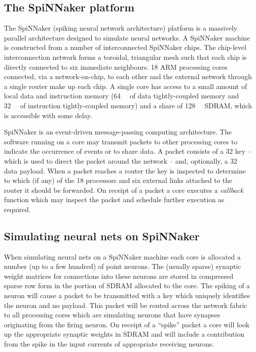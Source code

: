 \documentclass[conference]{IEEEtran}
\begin{document}
  \subsection{The SpiNNaker platform}

  The SpiNNaker (spiking neural network architecture) platform is a massively
  parallel architecture designed to simulate neural networks.  A SpiNNaker
  machine is constructed from a number of interconnected SpiNNaker chips.  The
  chip-level interconnection network forms a toroidal, triangular mesh such
  that each chip is directly connected to six immediate neighbours.  18 ARM
  processing cores connected, via a network-on-chip, to each other and the
  external network through a single router make up each chip.  A single core
  has access to a small amount of local data and instruction memory
  (\SI{64}{\kibi\byte} of data tightly-coupled memory and \SI{32}{\kibi\byte}
  of instruction tightly-coupled memory) and a share of \SI{128}{\mebi\byte}
  SDRAM, which is accessible with some delay.

  SpiNNaker is an event-driven message-passing computing architecture.  The
  software running on a core may transmit packets to other processing cores to
  indicate the occurrence of events or to share data.  A packet consists of a
  \SI{32}{\bit} key -- which is used to direct the packet around the network --
  and, optionally, a \SI{32}{\bit} data payload.  When a packet reaches a
  router the key is inspected to determine to which (if any) of the 18
  processors and six external links attached to the router it should be
  forwarded.  On receipt of a packet a core executes a \textit{callback}
  function which may inspect the packet and schedule further execution as
  required.

  \subsection{Simulating neural nets on SpiNNaker}

  When simulating neural nets on a SpiNNaker machine each core is allocated a
  number (up to a few hundred) of point neurons.  The (usually sparse) synaptic
  weight matrices for connections into these neurons are stored in compressed
  sparse row form in the portion of SDRAM allocated to the core.  The spiking
  of a neuron will cause a packet to be transmitted with a key which uniquely
  identifies the neuron and no payload.  This packet will be routed across the
  network fabric to all processing cores which are simulating neurons that have
  synapses originating from the firing neuron.  On receipt of a ``spike''
  packet a core will look up the appropriate synaptic weights in SDRAM and will
  include a contribution from the spike in the input currents of appropriate
  receiving neurons.
\end{document}
